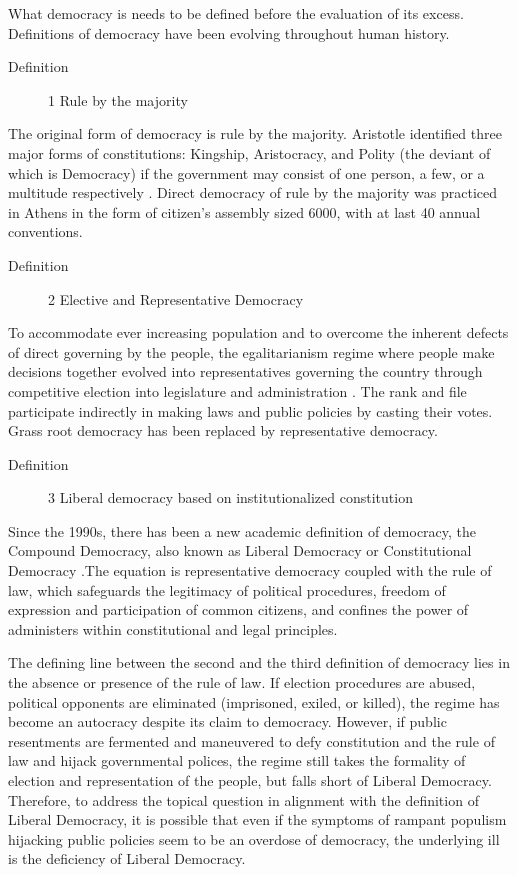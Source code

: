 \documentclass{scrartcl}
\begin{document}
What democracy is needs to be defined before the evaluation of its
excess. Definitions of democracy have been evolving throughout human
history. 
\begin{description}
\item [{Definition}] 1 Rule by the majority
\end{description}
The original form of democracy is rule by the majority. Aristotle
identified three major forms of constitutions: Kingship, Aristocracy,
and Polity (the deviant of which is Democracy) if the government may
consist of one person, a few, or a multitude respectively \autocite{arispol}.
Direct democracy of rule by the majority was practiced in Athens in
the form of citizen's assembly sized 6000, with at last 40 annual
conventions. 
\begin{description}
\item [{Definition}] 2 Elective and Representative Democracy
\end{description}
To accommodate ever increasing population and to overcome the inherent
defects of direct governing by the people, the egalitarianism regime
where people make decisions together evolved into representatives
governing the country through competitive election into legislature
and administration \autocite{capsocdem}. The rank and file participate
indirectly in making laws and public policies by casting their votes.
Grass root democracy has been replaced by representative democracy. 
\begin{description}
\item [{Definition}] 3 Liberal democracy based on institutionalized constitution
\end{description}
Since the 1990s, there has been a new academic definition of democracy,
the Compound Democracy, also known as Liberal Democracy or Constitutional
Democracy \autocite{Bao2018}.The equation is representative democracy
coupled with the rule of law, which safeguards the legitimacy of political
procedures, freedom of expression and participation of common citizens,
and confines the power of administers within constitutional and legal
principles. 

\bigskip{}

The defining line between the second and the third definition of democracy
lies in the absence or presence of the rule of law. If election procedures
are abused, political opponents are eliminated (imprisoned, exiled,
or killed), the regime has become an autocracy despite its claim to
democracy. However, if public resentments are fermented and maneuvered
to defy constitution and the rule of law and hijack governmental polices,
the regime still takes the formality of election and representation
of the people, but falls short of Liberal Democracy. Therefore, to
address the topical question in alignment with the definition of Liberal
Democracy, it is possible that even if the symptoms of rampant populism
hijacking public policies seem to be an overdose of democracy, the
underlying ill is the deficiency of Liberal Democracy.
\end{document}
